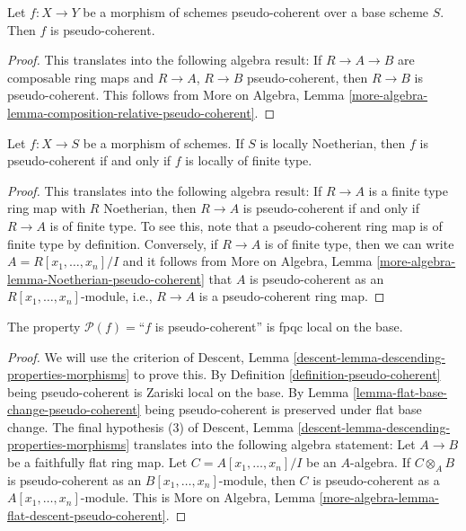 \begin{lemma}
\label{lemma-permanence-pseudo-coherent}
Let $f : X \to Y$ be a morphism of schemes pseudo-coherent
over a base scheme $S$. Then $f$ is pseudo-coherent.
\end{lemma}

\begin{proof}
This translates into the following algebra result:
If $R \to A \to B$ are composable ring maps
and $R \to A$, $R \to B$ pseudo-coherent, then
$R \to B$ is pseudo-coherent. This follows from
More on Algebra,
Lemma \ref{more-algebra-lemma-composition-relative-pseudo-coherent}.
\end{proof}

\begin{lemma}
\label{lemma-Noetherian-pseudo-coherent}
Let $f : X \to S$ be a morphism of schemes.
If $S$ is locally Noetherian, then $f$ is pseudo-coherent if
and only if $f$ is locally of finite type.
\end{lemma}

\begin{proof}
This translates into the following algebra result:
If $R \to A$ is a finite type ring map with $R$ Noetherian, then
$R \to A$ is pseudo-coherent if and only if $R \to A$ is of finite type.
To see this, note that a pseudo-coherent ring map is of finite type by
definition. Conversely, if $R \to A$ is of finite type, then
we can write $A = R[x_1, \ldots, x_n]/I$ and it follows from
More on Algebra,
Lemma \ref{more-algebra-lemma-Noetherian-pseudo-coherent}
that $A$ is pseudo-coherent as an $R[x_1, \ldots, x_n]$-module, i.e.,
$R \to A$ is a pseudo-coherent ring map.
\end{proof}

\begin{lemma}
\label{lemma-descending-property-pseudo-coherent}
The property $\mathcal{P}(f) =$``$f$ is pseudo-coherent''
is fpqc local on the base.
\end{lemma}

\begin{proof}
We will use the criterion of
Descent, Lemma \ref{descent-lemma-descending-properties-morphisms}
to prove this. By
Definition \ref{definition-pseudo-coherent}
being pseudo-coherent is Zariski local on the base. By
Lemma \ref{lemma-flat-base-change-pseudo-coherent}
being pseudo-coherent is preserved under flat base change.
The final hypothesis (3) of
Descent, Lemma \ref{descent-lemma-descending-properties-morphisms}
translates into the following algebra statement:
Let $A \to B$ be a faithfully flat ring map.
Let $C = A[x_1, \ldots, x_n]/I$ be an $A$-algebra.
If $C \otimes_A B$ is pseudo-coherent as an $B[x_1, \ldots, x_n]$-module,
then $C$ is pseudo-coherent as a $A[x_1, \ldots, x_n]$-module.
This is
More on Algebra, Lemma \ref{more-algebra-lemma-flat-descent-pseudo-coherent}.
\end{proof}

